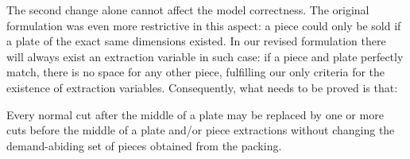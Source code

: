 \documentclass[runningheads]{llncs}
\begin{document}
The second change alone cannot affect the model correctness.
The original formulation was even more restrictive in this aspect:
a piece could only be sold if a plate of the exact same dimensions existed.
In our revised formulation there will always exist an extraction variable in such case:
if a piece and plate perfectly match, there is no space for any other piece, fulfilling our only criteria for the existence of extraction variables.
Consequently, what needs to be proved is that:

\begin{theorem}
Every normal cut after the middle of a plate may be replaced by one or more cuts before the middle of a plate and/or piece extractions without changing the demand-abiding set of pieces obtained from the packing.
\end{theorem}
\end{document}
